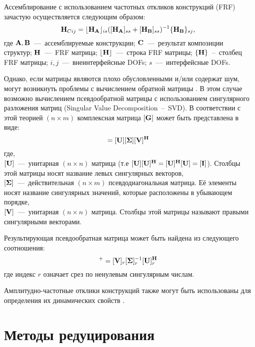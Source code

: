 Ассемблирование с использованием частотных откликов конструкций (FRF) зачастую осуществляется следующим образом:
\begin{equation*}
	\mathbf{H}_{Cij} = \lfloor \mathbf{H}_{\mathbf{A}} \rfloor_{is} ([\mathbf{H}_{\mathbf{A}}]_{ss} + [\mathbf{H}_{\mathbf{B}}]_{ss})^{-1} \{ \mathbf{H}_{\mathbf{B}} \}_{sj},
\end{equation*}
где $\mathbf{A}, \mathbf{B}$~---~ассемблируемые конструкции; $\mathbf{C}$~---~результат композиции структур; $\mathbf{H}$~---~FRF матрица; $\lfloor \mathbf{H} \rfloor$~---~строка FRF матрицы; $\{ \mathbf{H} \}$~--~столбец FRF матрицы; $ i, j $~---~внеинтерфейсные DOFs; $ s $~---~интерфейсные DOFs.

Однако, если матрицы являются плохо обусловленными и/или содержат шум, могут возникнуть проблемы с вычислением обратной матрицы \cite{lib:coupling:Gialamas}. В этом случае возможно вычислением псевдообратной матрицы с использованием сингулярного разложения матриц (Singular Value Decomposition~--~SVD). В соответствии с этой теорией $ (n \times m) $ комплексная матрица $ [\mathbf{G}] $ может быть представлена в виде:
\begin{equation}
	[\mat{G}] = [\mat{U}][\mat{\Sigma}][\mat{V}] ^ \mat{H}
\end{equation}
где, \\
$ [\mathbf{U}] $~---~унитарная $(n \times n)$ матрица (т.е $ [\mathbf{U}][\mathbf{U}] ^ {\mathbf{H}} = [\mathbf{U}] ^ {\mathbf{H}}[\mathbf{U}] = [\mathbf{I}] $). Столбцы этой матрицы носят название левых сингулярных векторов, \\
$[\mathbf{\Sigma}]$~---~действительная $(n \times m)$ псевдодиагональная матрица. Её элементы носят название сингулярных значений, которые расположены в убывающем порядке,\\
$[\mathbf{V}]$~---~унитарная ${(n \times n)}$ матрица. Столбцы этой матрицы называют правыми сингулярными векторами. 

Результирующая псевдообратная матрица может быть найдена из следующего соотношения:
\begin{equation}
	[\mat{G}]^{+} = [\mat{V}]_r [\mat{\Sigma}]_r ^ {-1} [\mat{U}]_r ^ \mat{H}
\end{equation}
где индекс $ r $ означает срез по ненулевым сингулярным числам.

Амплитудно-частотные отклики конструкций также могут быть использованы для определения их динамических свойств \cite{lib:coupling:Xi, lib:coupling:Malekjafarian}.

\section{Методы редуцирования}

